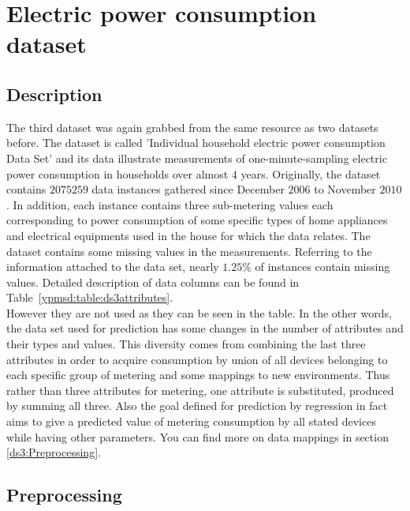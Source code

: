 \section{Electric power consumption dataset}
\label{db:sec:ds3}
\subsection{Description}
The third dataset was again grabbed from the same resource as two datasets before.
The dataset is called 'Individual household electric power consumption Data
Set\cite{ds:household}' and its data illustrate measurements of
one-minute-sampling electric power consumption in households over almost $4$
years. Originally, the dataset contains $2075259$ data instances gathered since
December $2006$ to November $2010$. In addition, each instance contains three
sub-metering values each corresponding to power consumption of some specific types
of home appliances and electrical equipments used in the house for which the
data relates. The dataset contains some missing values in the measurements.
Referring to the information attached to the data set, nearly $1.25\%$ of
instances contain missing values. Detailed description of data columns can be
found in Table~\ref{ypmsd:table:ds3attributes}.\\
However they are not used as they can be seen in the table. In the other words,
the data set used for prediction has some changes in the number of attributes
and their types and values.
This diversity comes from combining the last three attributes in order to acquire consumption by union of all devices
belonging to each specific group of metering and some mappings to new
environments.
Thus rather than three attributes for metering, one attribute is substituted, produced by summing all three. Also the
goal defined for prediction by regression in fact aims to give a predicted value
of metering consumption by all stated devices while having other parameters.
You can find more on data mappings in section \ref{ds3:Preprocessing}.








\subsection{Preprocessing\label{ds3:Preprocessing}}

